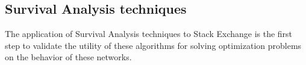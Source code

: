 \documentclass[11pt]{book} %
\begin{document}
    \subsection{Survival Analysis techniques}

      The application of Survival Analysis techniques to Stack Exchange is the first step to validate the utility of these algorithms for solving optimization problems on the behavior of these networks.




\newpage


\nocite{*}
\newpage
\printbibliography
\end{document}
